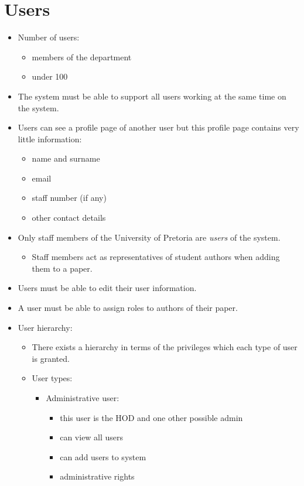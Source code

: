 \documentclass{article}
\begin{document}
\section{Users}\label{sec:users}
	\begin{itemize}
		\item Number of users:
		\begin{itemize}
			\item members of the department
			\item under 100
		\end{itemize}
		\item The system must be able to support all users working at the same time on the system.
		\item Users can see a profile page of another user but this profile page contains very little information:
		\begin{itemize}
			\item name and surname
			\item email
			\item staff number (if any)
			\item other contact details
		\end{itemize}
		\item Only staff members of the University of Pretoria are \textit{users} of the system.
		\begin{itemize}
			\item Staff members act as representatives of student authors when adding them to a paper.
		\end{itemize}
		\item Users must be able to edit their user information.
		\item A user must be able to assign roles to authors of their paper.
		\item User hierarchy:
		\begin{itemize}
			\item There exists a hierarchy in terms of the privileges which each type of user is granted.
			\item User types:
			\begin{itemize}
				\item Administrative user:
				\begin{itemize}
					\item this user is the HOD and one other possible admin
					\item can view all users
					\item can add users to system
					\item administrative rights

\end{itemize}
\end{itemize}
\end{itemize}
\end{itemize}
\end{document}
